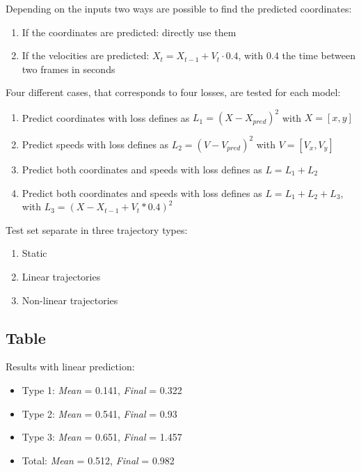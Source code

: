 \documentclass[a0,portrait]{a0poster}
\begin{document}
\begin{multicols}{2}
Depending on the inputs two ways are possible to find the predicted coordinates:\\
\begin{enumerate}
\justifying
\item If the coordinates are predicted: directly use them
\item If the velocities are predicted: $X_{t} = X_{t-1} + V_{t}\cdot 0.4$, with $0.4$ the time between two frames in seconds
\end{enumerate}

Four different cases, that corresponds to four losses, are tested for each model:
\begin{enumerate}
\justifying
\item Predict coordinates with loss defines as $L_1 = (X-X_{pred})^2$ with $X = [x,y]$
\item Predict speeds with loss defines as $L_2 = (V-V_{pred})^2$ with $V = [V_x,V_y]$ 
\item Predict both coordinates and speeds with loss defines as $L = L_1 + L_2$
\item Predict both coordinates and speeds with loss defines as $L = L_1 + L_2 + L_3 $, with $L_3 = (X- X_{t-1} + V_t*0.4)^2$
\end{enumerate}
\vspace{0.3cm}
Test set separate in three trajectory types:\\
\begin{enumerate}
\justifying
\item Static
\item Linear trajectories
\item Non-linear trajectories
\end{enumerate}

\subsection{Table}

\fontsize{9pt}{5.5}\selectfont
Results with linear prediction:
\begin{itemize}
\item Type 1: \emph{Mean} = 0.141, \emph{Final} = 0.322
\item Type 2: \emph{Mean} = 0.541, \emph{Final} = 0.93
\item Type 3: \emph{Mean} = 0.651, \emph{Final} = 1.457
\item Total: \emph{Mean} = 0.512, \emph{Final} = 0.982 


\end{itemize}
\end{multicols}
\end{document}
